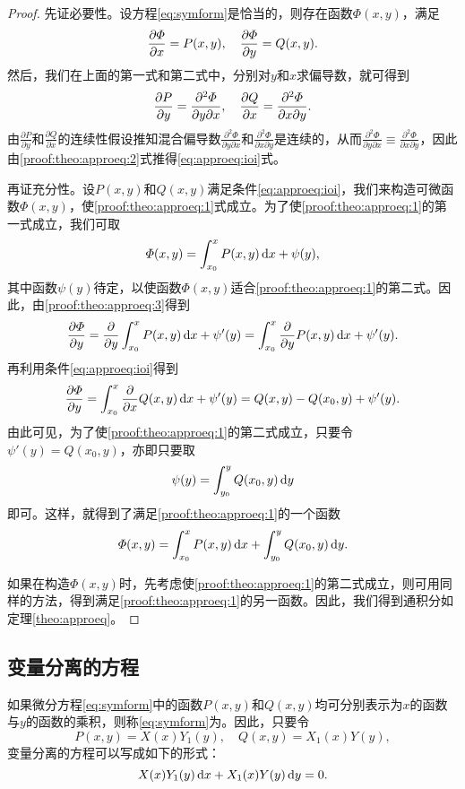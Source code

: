 \begin{proof}
先证必要性。设方程\eqref{eq:symform}是恰当的，则存在函数$\varPhi(x,y)$，满足
\begin{equation}\label{proof:theo:approeq:1}
\frac{\partial{}\varPhi}{\partial{}x}=P(x,y),\quad\frac{\partial{}\varPhi}{\partial{}y}=Q(x,y).
\end{equation}
然后，我们在上面的第一式和第二式中，分别对$y$和$x$求偏导数，就可得到
\begin{equation}\label{proof:theo:approeq:2}
\frac{\partial{}P}{\partial{}y}=\frac{\partial^2\varPhi}{\partial y\partial x},\quad\frac{\partial{}Q}{\partial{}x}=\frac{\partial^2\varPhi}{\partial x\partial y}.
\end{equation}
由$\tfrac{\partial P}{\partial y}$和$\tfrac{\partial Q}{\partial x}$的连续性假设推知混合偏导数$\tfrac{\partial^2\varPhi}{\partial y\partial x}$和$\tfrac{\partial^2\varPhi}{\partial x\partial y}$是连续的，从而$\tfrac{\partial^2\varPhi}{\partial y\partial x}\equiv\frac{\partial^2\varPhi}{\partial x\partial y}$，因此由\eqref{proof:theo:approeq:2}式推得\eqref{eq:approeq:ioi}式。

再证充分性。设$P(x,y)$和$Q(x,y)$满足条件\eqref{eq:approeq:ioi}，我们来构造可微函数$\varPhi(x,y)$，使\eqref{proof:theo:approeq:1}式成立。为了使\eqref{proof:theo:approeq:1}的第一式成立，我们可取
\begin{equation}\label{proof:theo:approeq:3}
\varPhi(x,y)=\int_{x_0}^{x}P(x,y)\,\mathrm{d} x+\psi(y),
\end{equation}
其中函数$\psi(y)$待定，以使函数$\varPhi(x,y)$适合\eqref{proof:theo:approeq:1}的第二式。因此，由\eqref{proof:theo:approeq:3}得到
\[
\frac{\partial{}\varPhi}{\partial{}y}=\frac{\partial{}}{\partial{}y}\int_{x_0}^{x}P(x,y)\,\mathrm{d} x+\psi'(y)=\int_{x_0}^x\frac{\partial{}}{\partial{}y}P(x,y)\,\mathrm{d} x+\psi'(y).
\]
再利用条件\eqref{eq:approeq:ioi}得到
\[
\frac{\partial{}\varPhi}{\partial{}y}=\int_{x_0}^x\frac{\partial{}}{\partial{}x}Q(x,y)\,\mathrm{d} x+\psi'(y)=Q(x,y)-Q(x_0,y)+\psi'(y).
\]
由此可见，为了使\eqref{proof:theo:approeq:1}的第二式成立，只要令$\psi'(y)=Q(x_0,y)$，亦即只要取\[
\psi(y)=\int_{y_0}^yQ(x_0,y)\,\mathrm{d} y
\]即可。这样，就得到了满足\eqref{proof:theo:approeq:1}的一个函数\[
\varPhi(x,y)=\int_{x_0}^xP(x,y)\,\mathrm{d} x+\int_{y_0}^yQ(x_0,y)\,\mathrm{d} y.
\]

如果在构造$\varPhi(x,y)$时，先考虑使\eqref{proof:theo:approeq:1}的第二式成立，则可用同样的方法，得到满足\eqref{proof:theo:approeq:1}的另一函数。因此，我们得到通积分如定理\ref{theo:approeq}。
\end{proof}

\subsection{变量分离的方程}
如果微分方程\eqref{eq:symform}中的函数$P(x,y)$和$Q(x,y)$均可分别表示为$x$的函数与$y$的函数的乘积，则称\eqref{eq:symform}为。因此，只要令\[
P(x,y)=X(x)Y_1(y),\quad Q(x,y)=X_1(x)Y(y),
\]变量分离的方程可以写成如下的形式：
\begin{equation}\label{eq:varsep}
X(x)Y_1(y)\,\mathrm{d} x+X_1(x)Y(y)\,\mathrm{d} y=0.
\end{equation}

